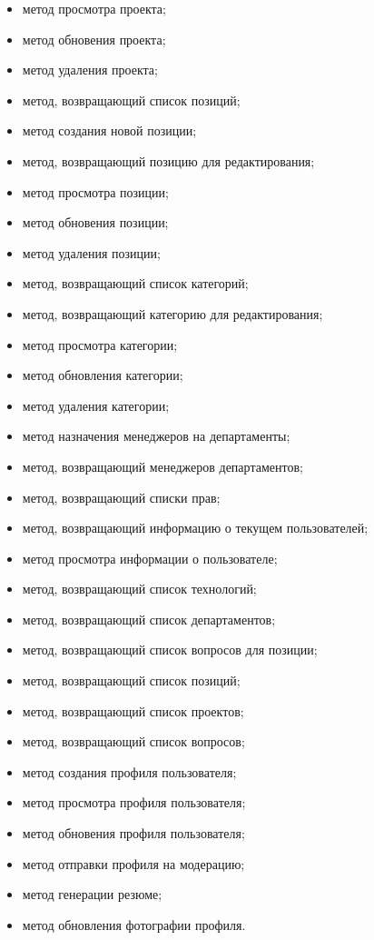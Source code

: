 \begin{itemize}
	\item метод просмотра проекта;
	\item метод обновения проекта;
	\item метод удаления проекта;
	\item метод, возвращающий список позиций;
	\item метод создания новой позиции;
	\item метод, возвращающий позицию для редактирования;
	\item метод просмотра позиции;
	\item метод обновения позиции;
	\item метод удаления позиции;
	\item метод, возвращающий список категорий;
	\item метод, возвращающий категорию для редактирования;
	\item метод просмотра категории;
	\item метод обновления категории;
	\item метод удаления категории;
	\item метод назначения менеджеров на департаменты;
	\item метод, возвращающий менеджеров департаментов;
	\item метод, возвращающий списки прав;
	\item метод, возвращающий информацию о текущем пользователей;
	\item метод просмотра информации о пользователе;
	\item метод, возвращающий список технологий;
	\item метод, возвращающий список департаментов;
	\item метод, возвращающий список вопросов для позиции;
	\item метод, возвращающий список позиций;
	\item метод, возвращающий список проектов;
	\item метод, возвращающий список вопросов;
	\item метод создания профиля пользователя;
	\item метод просмотра профиля пользователя;
	\item метод обновения профиля пользователя;
	\item метод отправки профиля на модерацию;
	\item метод генерации резюме;
	\item метод обновления фотографии профиля.
\end{itemize}

